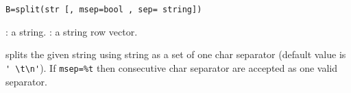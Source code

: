 
\begin{mandesc}
\end{mandesc}
\begin{calling_sequence}
\begin{verbatim}
B=split(str [, msep=bool , sep= string]) 
\end{verbatim}
\end{calling_sequence}

\begin{parameters}
  \begin{varlist}
    : a string.
    : a string row vector.
  \end{varlist}
\end{parameters}

\begin{mandescription}
splits the given string using string as a set of one char separator 
(default value is \verb+' \t\n'+). If \verb+msep=%t+ then consecutive char
separator are accepted as one valid separator. 
\end{mandescription}

\begin{examples}
  \begin{program}
  \end{program}
\end{examples}


